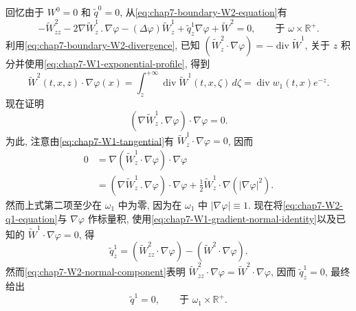 \begin{sloppypar}
回忆由于 $W^0=0$ 和 $\widetilde q^0=0$, 从\eqref{eq:chap7-boundary-W2-equation}有
\begin{equation}
 -\widetilde W^2_{zz}-2\nabla\widetilde W^1_z\mathbin{.}\nabla\varphi
 -(\Delta\varphi)\widetilde W^1_z
 +\widetilde q^1_z\nabla\varphi+\widetilde W^2=0,
 \qquad\text{于 }\omega\times\mathbb R^+.
\label{eq:chap7-W2-q1-equation}
\end{equation}
利用\eqref{eq:chap7-boundary-W2-divergence}, 已知 $(\widetilde W^2_z\cdot\nabla\varphi)=-\operatorname{div}\widetilde W^1$, 关于 $z$ 积分并使用\eqref{eq:chap7-W1-exponential-profile}, 得到
\begin{equation}
 \widetilde W^2(t,x,z)\cdot\nabla\varphi(x)
 =\int_z^{+\infty}\operatorname{div}\widetilde W^1(t,x,\zeta)\,d\zeta
 =\operatorname{div}w_1(t,x)e^{-z}.
\label{eq:chap7-W2-normal-component}
\end{equation}
现在证明
\begin{equation}
 (\nabla\widetilde W^1_z\mathbin{.}\nabla\varphi)\cdot\nabla\varphi=0.
\label{eq:chap7-W1-gradient-normal-identity}
\end{equation}
为此, 注意由\eqref{eq:chap7-W1-tangential}有 $\widetilde W^1_z\cdot\nabla\varphi=0$, 因而
\[
\begin{split}
 0&=\nabla(\widetilde W^1_z\cdot\nabla\varphi)\cdot\nabla\varphi\\
  &=(\nabla\widetilde W^1_z\mathbin{.}\nabla\varphi)\cdot\nabla\varphi
  +\frac12\widetilde W^1_z\cdot\nabla(|\nabla\varphi|^2).
\end{split}
\]
然而上式第二项至少在 $\omega_1$ 中为零, 因为在 $\omega_1$ 中 $|\nabla\varphi|\equiv1$. 现在将\eqref{eq:chap7-W2-q1-equation}与 $\nabla\varphi$ 作标量积, 使用\eqref{eq:chap7-W1-gradient-normal-identity}以及已知的 $\widetilde W^1\cdot\nabla\varphi=0$, 得
\[
 \widetilde q^1_z=(\widetilde W^2_{zz}\cdot\nabla\varphi)
 -(\widetilde W^2\cdot\nabla\varphi).
\]
然而\eqref{eq:chap7-W2-normal-component}表明 $\widetilde W^2_{zz}\cdot\nabla\varphi=\widetilde W^2\cdot\nabla\varphi$, 因而 $\widetilde q^1_z=0$, 最终给出
\begin{equation}
 \widetilde q^1=0,\qquad\text{于 }\omega_1\times\mathbb R^+.
\label{eq:chap7-q1-boundary-zero}
\end{equation}


\end{sloppypar}
